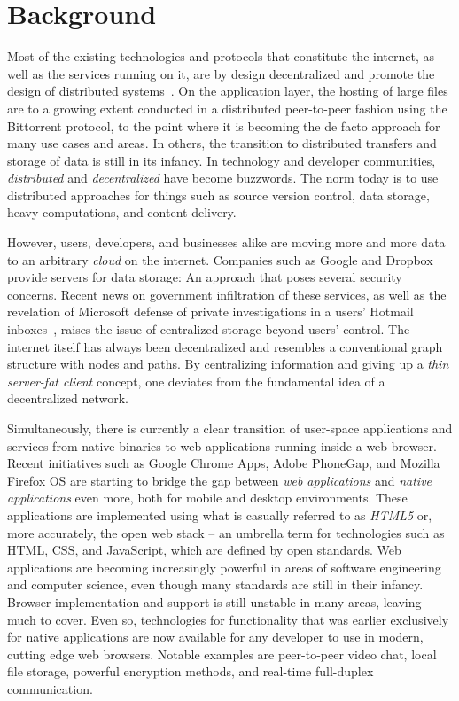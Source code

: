 \section{Background}

Most of the existing technologies and protocols that constitute the internet, as well as the services running on it, are by design decentralized and promote the design of distributed systems~\cite{InternetDecenterlized:Online}. On the application layer, the hosting of large files are to a growing extent conducted in a distributed peer-to-peer fashion using the Bittorrent protocol, to the point where it is becoming the de facto approach for many use cases and areas. In others, the transition to distributed transfers and storage of data is still in its infancy. In technology and developer communities, \emph{distributed} and \emph{decentralized} have become buzzwords. The norm today is to use distributed approaches for things such as source version control, data storage, heavy computations, and content delivery.

However, users, developers, and businesses alike are moving more and more data to an arbitrary \emph{cloud} on the internet. Companies such as Google and Dropbox provide servers for data storage: An approach that poses several security concerns. Recent news on government infiltration of these services, as well as the revelation of Microsoft defense of private investigations in a users' Hotmail inboxes~\cite{Frank:2014}, raises the issue of centralized storage beyond users' control. The internet itself has always been decentralized and resembles a conventional graph structure with nodes and paths. By centralizing information and giving up a \emph{thin server-fat client} concept, one deviates from the fundamental idea of a decentralized network.

Simultaneously, there is currently a clear transition of user-space applications and services from native binaries to web applications running inside a web browser. Recent initiatives such as Google Chrome Apps, Adobe PhoneGap, and Mozilla Firefox OS are starting to bridge the gap between \emph{web applications} and \emph{native applications} even more, both for mobile and desktop environments. These applications are implemented using what is casually referred to as \emph{HTML5} or, more accurately, the open web stack – an umbrella term for technologies such as HTML, CSS, and JavaScript, which are defined by open standards. Web applications are becoming increasingly powerful in areas of software engineering and computer science, even though many standards are still in their infancy. Browser implementation and support is still unstable in many areas, leaving much to cover. Even so, technologies for functionality that was earlier exclusively for native applications are now available for any developer to use in modern, cutting edge web browsers. Notable examples are peer-to-peer video chat, local file storage, powerful encryption methods, and real-time full-duplex communication.

